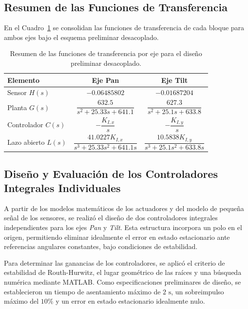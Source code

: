 \documentclass[12pt,a4paper]{article}
\begin{document}
\subsection{Resumen de las Funciones de Transferencia}
En el Cuadro~\ref{tab:resumen_ft} se consolidan las funciones de transferencia de cada bloque para ambos ejes bajo el esquema preliminar desacoplado.

\begin{table}[H]
    \centering
    \caption{Resumen de las funciones de transferencia por eje para el diseño preliminar desacoplado.}
    \label{tab:resumen_ft}
    \begin{tabular}{lcc}
        \toprule
        \textbf{Elemento} & \textbf{Eje Pan} & \textbf{Eje Tilt} \\
        \midrule
        Sensor $H(s)$ & $-0.06485802$ & $-0.01687204$ \\[6pt]
        Planta $G(s)$ & $\dfrac{632.5}{s^2 + 25.33s + 641.1}$ & $\dfrac{627.3}{s^2 + 25.1s + 633.8}$ \\[10pt]
        Controlador $C(s)$ & $-\dfrac{K_{I,x}}{s}$ & $-\dfrac{K_{I,y}}{s}$ \\[10pt]
        Lazo abierto $L(s)$ & $\dfrac{41.0227K_{I,x}}{s^3 + 25.33s^2 + 641.1s}$ & $\dfrac{10.5838K_{I,y}}{s^3 + 25.1s^2 + 633.8s}$ \\[10pt]
        \bottomrule
    \end{tabular}
\end{table}

\subsection{Diseño y Evaluación de los Controladores Integrales Individuales}
A partir de los modelos matemáticos de los actuadores y del modelo de pequeña señal de los sensores, se realizó el diseño de dos controladores integrales independientes para los ejes \emph{Pan} y \emph{Tilt}. Esta estructura incorpora un polo en el origen, permitiendo eliminar idealmente el error en estado estacionario ante referencias angulares constantes, bajo condiciones de estabilidad.

Para determinar las ganancias de los controladores, se aplicó el criterio de estabilidad de Routh-Hurwitz, el lugar geométrico de las raíces y una búsqueda numérica mediante MATLAB. Como especificaciones preliminares de diseño, se establecieron un tiempo de asentamiento máximo de $2\text{ s}$, un sobreimpulso máximo del $10\%$ y un error en estado estacionario idealmente nulo.
\end{document}
